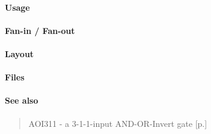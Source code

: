 \paragraph{Usage}

\paragraph{Fan-in / Fan-out}

\paragraph{Layout}

\paragraph{Files}

\paragraph{See also}
\begin{quote}
    AOI311 - a 3-1-1-input AND-OR-Invert gate [p.\pageref{AOI311}]
\end{quote}
